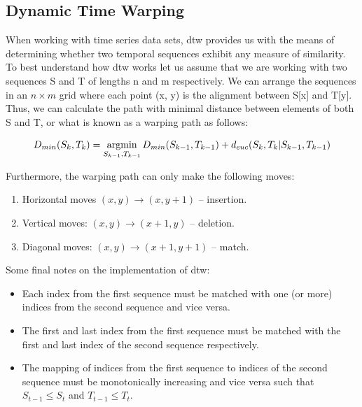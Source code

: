 \subsection{Dynamic Time Warping}
\label{subsec:Background-Information:Distance-Metrics:Dynamic-Time-Warping}
When working with time series data sets, \gls{dtw} provides us with the means of determining whether two temporal sequences exhibit any measure of similarity. To best understand how \gls{dtw} works let us assume that we are working with two sequences S and T of lengths n and m respectively. We can arrange the sequences in an $n \times m$ grid where each point (x, y) is the alignment between S[x] and T[y]. Thus, we can calculate the path with minimal distance between elements of both S and T, or what is known as a warping path as follows:

\begin{equation}
    D_{min}(S_k, T_k) = \operatorname*{argmin}_{S_{k-1}, T_{k-1}} D_{min} (S_{k-1}, T_{k-1}) + d_{euc}(S_k, T_k | S_{k-1}, T_{k-1})
\label{eq:DTW}
\end{equation}

\noindent \newline Furthermore, the warping path can only make the following moves:

\begin{enumerate}
    \item Horizontal moves $(x, y) \rightarrow (x, y + 1)$ -- insertion.
    \item Vertical moves: $(x, y) \rightarrow (x + 1, y)$ -- deletion.
    \item Diagonal moves: $(x, y) \rightarrow (x + 1, y + 1)$ -- match.
\end{enumerate}

\noindent \newline Some final notes on the implementation of \gls{dtw}:

\begin{itemize}
    \item Each index from the first sequence must be matched with one (or more) indices from the second sequence and vice versa.
    \item The first and last index from the first sequence must be matched with the first and last index of the second sequence respectively.
    \item The mapping of indices from the first sequence to indices of the second sequence must be monotonically increasing and vice versa such that $S_{t-1} \leq S_{t}$ and $T_{t-1} \leq T_{t}$.
\end{itemize}

